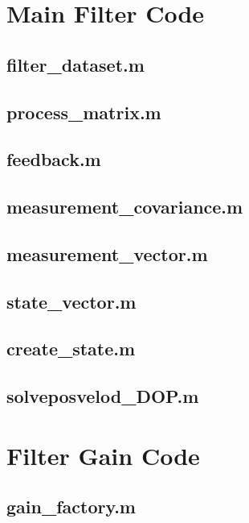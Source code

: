 \section{Main Filter Code}
\subsection{filter\_dataset.m}

\subsection{process\_matrix.m}

\subsection{feedback.m}

\subsection{measurement\_covariance.m}

\subsection{measurement\_vector.m}


\subsection{state\_vector.m}

\subsection{create\_state.m}

\subsection{solveposvelod\_DOP.m}


\section{Filter Gain Code}
\subsection{gain\_factory.m}

